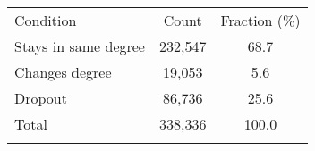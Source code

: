 \begin{center}
\begin{tabular}{lcc}
\hline \noalign{\smallskip}Condition & Count & Fraction (\%)\\
\noalign{\smallskip}\hline \noalign{\smallskip}Stays in same degree & 232,547 & 68.7\\
Changes degree & 19,053 & 5.6\\
Dropout & 86,736 & 25.6\\
Total & 338,336 & 100.0\\
\noalign{\smallskip}\hline\end{tabular}\\
\end{center}
